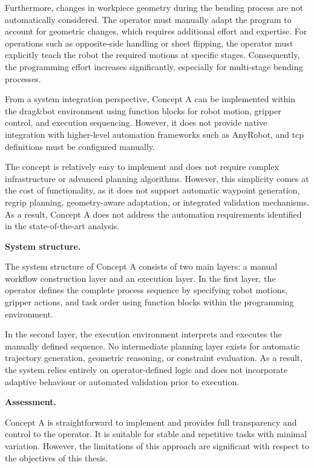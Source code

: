 Furthermore, changes in workpiece geometry during the bending process are not automatically considered. The operator must manually adapt the program to account for geometric changes, which requires additional effort and expertise. For operations such as opposite-side handling or sheet flipping, the operator must explicitly teach the robot the required motions at specific stages. Consequently, the programming effort increases significantly, especially for multi-stage bending processes.

From a system integration perspective, Concept A can be implemented within the drag\&bot environment using function blocks for robot motion, gripper control, and execution sequencing. However, it does not provide native integration with higher-level automation frameworks such as AnyRobot, and \ac{tcp} definitions must be configured manually.

The concept is relatively easy to implement and does not require complex infrastructure or advanced planning algorithms. However, this simplicity comes at the cost of functionality, as it does not support automatic waypoint generation, regrip planning, geometry-aware adaptation, or integrated validation mechanisms. As a result, Concept A does not address the automation requirements identified in the state-of-the-art analysis.

\label{sec:concept-a-system-structure}
\noindent\textbf{System structure.}

The system structure of Concept A consists of two main layers: a manual workflow construction layer and an execution layer. In the first layer, the operator defines the complete process sequence by specifying robot motions, gripper actions, and task order using function blocks within the programming environment.

In the second layer, the execution environment interprets and executes the manually defined sequence. No intermediate planning layer exists for automatic trajectory generation, geometric reasoning, or constraint evaluation. As a result, the system relies entirely on operator-defined logic and does not incorporate adaptive behaviour or automated validation prior to execution.

\label{sec:concept-a-critical-evaluation}
\noindent\textbf{Assessment.}

Concept A is straightforward to implement and provides full transparency and control to the operator. It is suitable for stable and repetitive tasks with minimal variation. However, the limitations of this approach are significant with respect to the objectives of this thesis.

